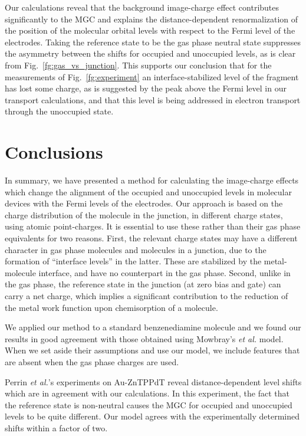 \documentclass[aip,jcp,a4paper,reprint,floatfix,superscriptaddress]{revtex4-1}
\newcommand{\etal}{\emph{et al.}\xspace}
\begin{document}
Our calculations reveal that the background image-charge effect contributes significantly to the MGC and explains the distance-dependent renormalization of the position of the molecular orbital levels with respect to the Fermi level of the electrodes. 
Taking the reference state to be the gas phase neutral state suppresses the asymmetry between the shifts for occupied and unoccupied levels, as is clear from Fig.~\ref{fg:gas_vs_junction}.
This supports our conclusion that for the measurements of Fig.~\ref{fg:experiment} an interface-stabilized level of the fragment has lost some charge, as is suggested by the peak above the Fermi level in our transport calculations, and that this level is being addressed in electron transport through the unoccupied state.





\section{Conclusions}

In summary, we have presented a method for calculating the image-charge effects which change the alignment of the occupied and unoccupied levels in molecular devices with the Fermi levels of the electrodes. Our approach is based on the charge distribution of the molecule in the junction, in different charge states, using atomic point-charges. It is essential to use these rather than their gas phase equivalents for two reasons. First, the relevant charge states may have a different character in gas phase molecules and molecules in a junction, due to the formation of ``interface levels'' in the latter. These are stabilized by the metal-molecule interface, and have no counterpart in the gas phase. Second, unlike in the gas phase, the reference state in the junction (at zero bias and gate) can carry a net charge, which implies a significant contribution to the reduction of the metal work function upon chemisorption of a molecule.

We applied our method to a standard benzenediamine molecule and we found our results in good agreement with those obtained using Mowbray's \etal model. When we set aside their assumptions and use our model, we include features that are absent when the gas phase charges are used. 

Perrin \etal's\cite{Perrin2013} experiments on Au-ZnTPPdT reveal distance-dependent level shifts which are in agreement with our calculations. In this experiment, the fact that the reference state is non-neutral causes the MGC for occupied and unoccupied levels to be quite different. 
Our model agrees with the experimentally determined shifts within a factor of two.
\end{document}
